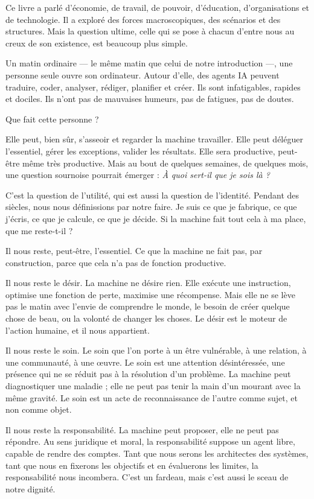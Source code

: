 
Ce livre a parlé d'économie, de travail, de pouvoir, d'éducation, d'organisations et de technologie. Il a exploré des forces macroscopiques, des scénarios et des structures. Mais la question ultime, celle qui se pose à chacun d'entre nous au creux de son existence, est beaucoup plus simple.

Un matin ordinaire — le même matin que celui de notre introduction —, une personne seule ouvre son ordinateur. Autour d'elle, des agents IA peuvent traduire, coder, analyser, rédiger, planifier et créer. Ils sont infatigables, rapides et dociles. Ils n'ont pas de mauvaises humeurs, pas de fatigues, pas de doutes.

Que fait cette personne ?

Elle peut, bien sûr, s'asseoir et regarder la machine travailler. Elle peut déléguer l'essentiel, gérer les exceptions, valider les résultats. Elle sera productive, peut-être même très productive. Mais au bout de quelques semaines, de quelques mois, une question sournoise pourrait émerger : \emph{À quoi sert-il que je sois là ?}

C'est la question de l'utilité, qui est aussi la question de l'identité. Pendant des siècles, nous nous définissions par notre faire. Je suis ce que je fabrique, ce que j'écris, ce que je calcule, ce que je décide. Si la machine fait tout cela à ma place, que me reste-t-il ?

Il nous reste, peut-être, l'essentiel. Ce que la machine ne fait pas, par construction, parce que cela n'a pas de fonction productive.

Il nous reste le désir. La machine ne désire rien. Elle exécute une instruction, optimise une fonction de perte, maximise une récompense. Mais elle ne se lève pas le matin avec l'envie de comprendre le monde, le besoin de créer quelque chose de beau, ou la volonté de changer les choses. Le désir est le moteur de l'action humaine, et il nous appartient.

Il nous reste le soin. Le soin que l'on porte à un être vulnérable, à une relation, à une communauté, à une œuvre. Le soin est une attention désintéressée, une présence qui ne se réduit pas à la résolution d'un problème. La machine peut diagnostiquer une maladie ; elle ne peut pas tenir la main d'un mourant avec la même gravité. Le soin est un acte de reconnaissance de l'autre comme sujet, et non comme objet.

Il nous reste la responsabilité. La machine peut proposer, elle ne peut pas répondre. Au sens juridique et moral, la responsabilité suppose un agent libre, capable de rendre des comptes. Tant que nous serons les architectes des systèmes, tant que nous en fixerons les objectifs et en évaluerons les limites, la responsabilité nous incombera. C'est un fardeau, mais c'est aussi le sceau de notre dignité.

